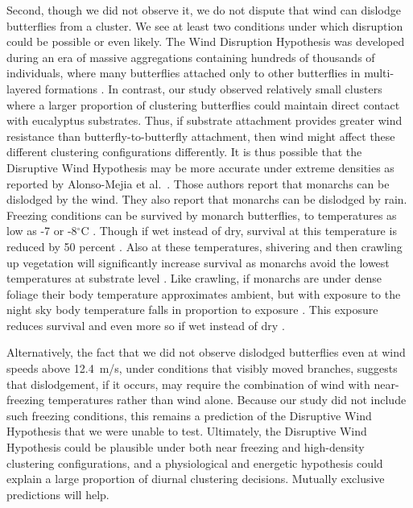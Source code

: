 \documentclass[insects,article,submit,pdftex,moreauthors]{Definitions/mdpi}
\begin{document}
Second, though we did not observe it, we do not dispute that wind can dislodge butterflies from a cluster. We see at least two conditions under which disruption could be possible or even likely. The Wind Disruption Hypothesis was developed during an era of massive aggregations containing hundreds of thousands of individuals, where many butterflies attached only to other butterflies in multi-layered formations \cite{leongMicroenvironmentalFactorsAssociated1990,browerMonarchButterflyClusters2008}. In contrast, our study observed relatively small clusters where a larger proportion of clustering butterflies could maintain direct contact with eucalyptus substrates. Thus, if substrate attachment provides greater wind resistance than butterfly-to-butterfly attachment, then wind might affect these different clustering configurations differently. It is thus possible that the Disruptive Wind Hypothesis may be more accurate under extreme densities as reported by Alonso-Mejia et al.\ \cite{alonso-mejiaInfluenceTemperatureSurface1992}. Those authors report that monarchs can be dislodged by the wind. They also report that monarchs can be dislodged by rain. Freezing conditions can be survived by monarch butterflies, to temperatures as low as -7 or -8$^{\circ}$C \cite{alonso-mejiaInfluenceTemperatureSurface1992,andersonFreezeprotectionOverwinteringMonarch1996}. Though if wet instead of dry, survival at this temperature is reduced by 50 percent \cite{alonso-mejiaInfluenceTemperatureSurface1992}. Also at these temperatures, shivering and then crawling up vegetation will significantly increase survival as monarchs avoid the lowest temperatures at substrate level \cite{andersonFreezeprotectionOverwinteringMonarch1996,mastersMonarchButterflyDanaus1988}. Like crawling, if monarchs are under dense foliage their body temperature approximates ambient, but with exposure to the night sky body temperature falls in proportion to exposure \cite{andersonFreezeprotectionOverwinteringMonarch1996}. This exposure reduces survival and even more so if wet instead of dry \cite{andersonFreezeprotectionOverwinteringMonarch1996}.

Alternatively, the fact that we did not observe dislodged butterflies even at wind speeds above 12.4~m/s, under conditions that visibly moved branches, suggests that dislodgement, if it occurs, may require the combination of wind with near-freezing temperatures rather than wind alone. Because our study did not include such freezing conditions, this remains a prediction of the Disruptive Wind Hypothesis that we were unable to test. Ultimately, the Disruptive Wind Hypothesis could be plausible under both near freezing and high-density clustering configurations, and a physiological and energetic hypothesis could explain a large proportion of diurnal clustering decisions. Mutually exclusive predictions will help.
\end{document}
